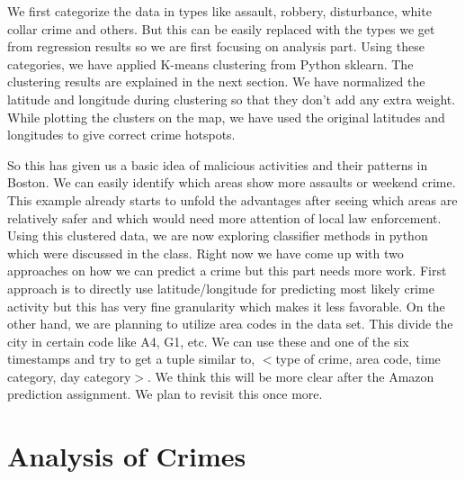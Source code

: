 \documentclass[journal, a4paper]{IEEEtran}
\begin{document}
    We first categorize the data in types like assault, robbery, disturbance, white collar crime and others. But this can be easily replaced with the types we get from regression results so we are first focusing on analysis part. Using these categories, we have applied K-means clustering from Python sklearn. The clustering results are explained in the next section. We have normalized the latitude and longitude during clustering so that they don't add any extra weight. While plotting the clusters on the map, we have used the original latitudes and longitudes to give correct crime hotspots.

    So this has given us a basic idea of malicious activities and their patterns in Boston. We can easily identify which areas show more assaults or weekend crime. This example already starts to unfold the advantages after seeing which areas are relatively safer and which would need more attention of local law enforcement. Using this clustered data, we are now exploring classifier methods in python which were discussed in the class. Right now we have come up with two approaches on how we can predict a crime but this part needs more work. First approach is to directly use latitude/longitude for predicting most likely crime activity but this has very fine granularity which makes it less favorable. On the other hand, we are planning to utilize area codes in the data set. This divide the city in certain code like A4, G1, etc. We can use these and one of the six timestamps and try to get a tuple similar to, $<$type of crime, area code, time category, day category$>$. We think this will be more clear after the Amazon prediction assignment. We plan to revisit this once more.
    



\section{Analysis of Crimes}
\end{document}
